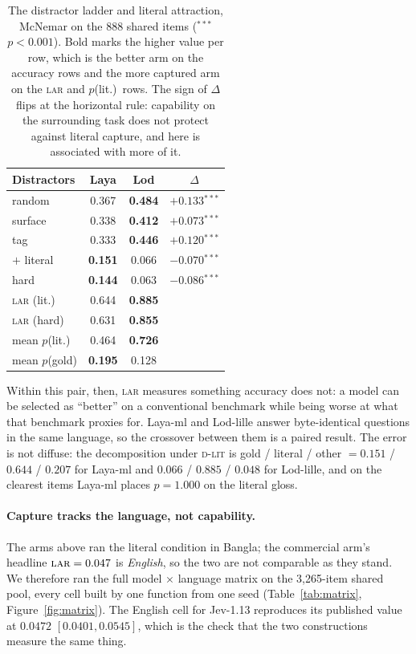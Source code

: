 \documentclass[11pt]{article}
\newcommand{\laya}[1]{\cellcolor{fLaya}#1}
\newcommand{\lod}[1]{\cellcolor{fLod}#1}
\newcommand{\neu}[1]{\cellcolor{fGrey!55}#1}
\newcommand{\layah}[1]{\cellcolor{cLaya!55}\textbf{#1}}
\newcommand{\lodh}[1]{\cellcolor{cLod!42}\textbf{#1}}
\newcommand{\Dlit}{\textsc{d-lit}}
\newcommand{\LAR}{\textsc{lar}}
\begin{document}
\begin{table}[t]
\centering\small
\setlength{\tabcolsep}{4pt}
\begin{tabular}{lccc}
\toprule
\textbf{Distractors} & \laya{\textbf{Laya}} & \lod{\textbf{Lod}} & $\Delta$ \\
\midrule
random        & \laya{0.367} & \lodh{0.484} & \neu{$+0.133$$^{***}$} \\
surface       & \laya{0.338} & \lodh{0.412} & \neu{$+0.073$$^{***}$} \\
tag           & \laya{0.333} & \lodh{0.446} & \neu{$+0.120$$^{***}$} \\
\midrule
$+$ literal   & \layah{0.151} & \lod{0.066} & \neu{$-0.070$$^{***}$} \\
hard          & \layah{0.144} & \lod{0.063} & \neu{$-0.086$$^{***}$} \\
\midrule
\LAR{} (lit.) & \laya{0.644} & \lodh{0.885} & \neu{} \\
\LAR{} (hard) & \laya{0.631} & \lodh{0.855} & \neu{} \\
mean $p$(lit.)& \laya{0.464} & \lodh{0.726} & \neu{} \\
mean $p$(gold)& \layah{0.195} & \lod{0.128} & \neu{} \\
\bottomrule
\end{tabular}
\caption{The distractor ladder and literal attraction, McNemar on the 888 shared
items ($^{***}$ $p<0.001$). Bold marks the higher value per row, which is the
better arm on the accuracy rows and the more captured arm on the \LAR{} and
$p$(lit.)\ rows. The
sign of $\Delta$ flips at the horizontal rule: capability on the surrounding task
does not protect against literal capture, and here is associated with more of
it.}
\label{tab:ladder}
\end{table}

Within this pair, then, \LAR{} measures something accuracy does not: a model
can be selected as ``better'' on a conventional benchmark while being worse at
what that benchmark proxies for. Laya-ml and Lod-lille answer byte-identical questions in the same language, so
the crossover between them is a paired result. The error is not diffuse:
the decomposition under \Dlit{} is gold / literal / other $= 0.151$ / $0.644$ /
$0.207$ for Laya-ml and $0.066$ / $0.885$ / $0.048$ for Lod-lille, and on the
clearest items Laya-ml places $p = 1.000$ on the literal gloss.

\paragraph{Capture tracks the language, not capability.} The arms above ran
the literal condition in Bangla; the commercial arm's headline $\LAR = 0.047$
is \emph{English}, so the two are not comparable as they stand. We therefore
ran the full model $\times$ language matrix on the 3{,}265-item shared pool,
every cell built by one function from one seed
(Table~\ref{tab:matrix}, Figure~\ref{fig:matrix}). The English cell for
Jev-1.13 reproduces its published value at $0.0472$ $[0.0401, 0.0545]$, which
is the check that the two constructions measure the same thing.
\end{document}
